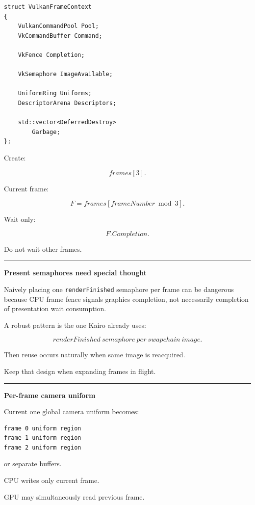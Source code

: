 \begin{verbatim}
struct VulkanFrameContext
{
    VulkanCommandPool Pool;
    VkCommandBuffer Command;

    VkFence Completion;

    VkSemaphore ImageAvailable;

    UniformRing Uniforms;
    DescriptorArena Descriptors;

    std::vector<DeferredDestroy>
        Garbage;
};
\end{verbatim}

Create:

\[
frames[3].
\]

Current frame:

\[
F=
frames[
frameNumber\bmod3
].
\]

Wait only:

\[
F.Completion.
\]

Do not wait other frames.

\begin{center}\rule{0.5\linewidth}{0.5pt}\end{center}

\textbf{Present semaphores need special thought}

Naively placing one \texttt{renderFinished} semaphore per frame can be dangerous because CPU frame fence signals graphics completion, not necessarily completion of presentation wait consumption.

A robust pattern is the one Kairo already uses:

\[
\boxed{
renderFinished\ semaphore\ per\ swapchain\ image.
}
\]

Then reuse occurs naturally when same image is reacquired.

Keep that design when expanding frames in flight.

\begin{center}\rule{0.5\linewidth}{0.5pt}\end{center}

\textbf{Per-frame camera uniform}

Current one global camera uniform becomes:

\begin{verbatim}
frame 0 uniform region
frame 1 uniform region
frame 2 uniform region
\end{verbatim}

or separate buffers.

CPU writes only current frame.

GPU may simultaneously read previous frame.

